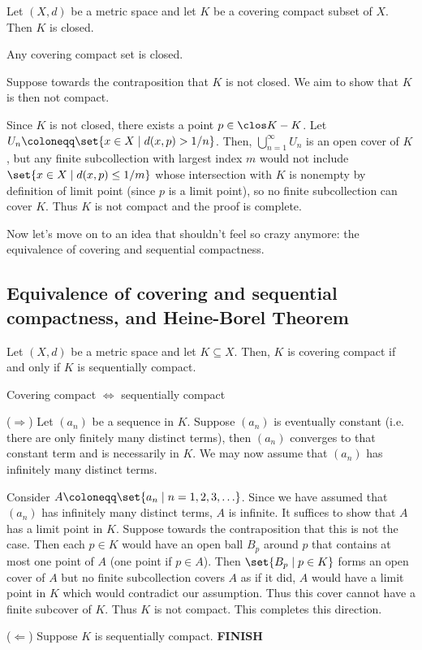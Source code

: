 \documentclass[class=article, crop=false]{standalone}
\begin{document}
\begin{thm}
    Let $(X,d)$ be a metric space and let $K$ be a covering compact subset of $X$. Then $K$ is closed.
\end{thm}
\begin{slogan}
    Any covering compact set is closed.
\end{slogan}
\begin{pf}
    Suppose towards the contraposition that $K$ is not closed. We aim to show that $K$ is then not compact.

    Since $K$ is not closed, there exists a point $p \in \clos K - K$. Let $U_n \coloneqq \set{x \in X \mid d(x,p) > 1/n}$. Then, $\bigcup_{n=1}^{\infty} U_n$ is an open cover of $K$, but any finite subcollection with largest index $m$ would not include $\set{x \in X \mid d(x,p) \leq 1/m}$ whose intersection with $K$ is nonempty by definition of limit point (since $p$ is a limit point), so no finite subcollection can cover $K$. Thus $K$ is not compact and the proof is complete.
\end{pf}

Now let's move on to an idea that shouldn't feel so crazy anymore: the equivalence of covering and sequential compactness.

\subsection{Equivalence of covering and sequential compactness, and Heine-Borel Theorem}

\begin{thm}
    Let $(X,d)$ be a metric space and let $K \subseteq X$. Then, $K$ is covering compact if and only if $K$ is sequentially compact.
\end{thm}
\begin{slogan}
    Covering compact $\iff$ sequentially compact
\end{slogan}
\begin{pf}
    ($\Rightarrow$) Let $(a_n)$ be a sequence in $K$. Suppose $(a_n)$ is eventually constant (i.e. there are only finitely many distinct terms), then $(a_n)$ converges to that constant term and is necessarily in $K$. We may now assume that $(a_n)$ has infinitely many distinct terms.

    Consider $A \coloneqq \set{a_n \mid n=1,2,3,\ldots}$. Since we have assumed that $(a_n)$ has infinitely many distinct terms, $A$ is infinite. It suffices to show that $A$ has a limit point in $K$. Suppose towards the contraposition that this is not the case. Then each $p \in K$ would have an open ball $B_p$ around $p$ that contains at most one point of $A$ (one point if $p \in A$).  Then $\set{B_p \mid p \in K}$ forms an open cover of $A$ but no finite subcollection covers $A$ as if it did, $A$ would have a limit point in $K$ which would contradict our assumption. Thus this cover cannot have a finite subcover of $K$. Thus $K$ is not compact. This completes this direction.

    ($\Leftarrow$) Suppose $K$ is sequentially compact. \textbf{FINISH}
\end{pf}
\end{document}
